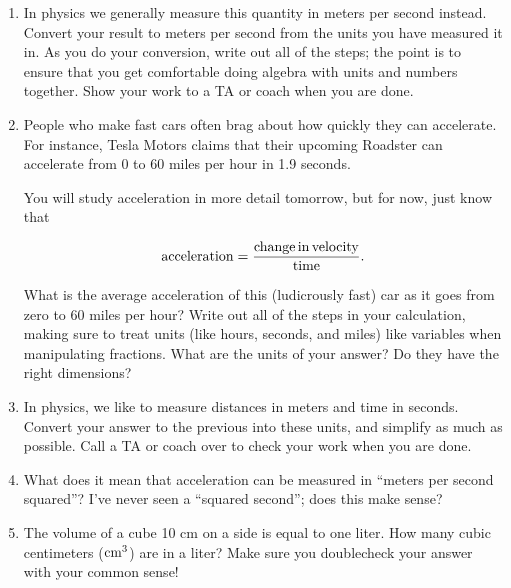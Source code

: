 \documentclass[12pt]{article}
\begin{document}
\begin{enumerate}
\item In physics we generally measure this quantity in meters per second instead. 
Convert your result to meters per second from the units you have measured it in. As you do your conversion, write out all of the 
steps; the point is to ensure that you get comfortable doing algebra with units and numbers together. Show your work to a TA
or coach when you are done.

\vspace{3in}

\newpage


\item People who make fast cars often brag about how quickly they can accelerate. For instance, Tesla Motors claims that
their upcoming Roadster can accelerate from 0 to 60 miles per hour in 1.9 seconds. 

You will study acceleration in more detail tomorrow, but for now, just know that

$$
{\rm acceleration} = \frac{\rm change\, in\, velocity}{\rm time}.
$$

What is the average acceleration of this (ludicrously fast) car as it goes from zero to 60 miles per hour? Write out all of the
steps in your calculation, making sure to treat units (like hours, seconds, and miles) like variables when manipulating fractions.
What are the units of your answer? Do they have the right dimensions?

\vspace{1.2in}

\item In physics, we like to measure distances in meters and time in seconds. Convert your answer to the previous into these
units, and simplify as much as possible. Call a TA or coach over to check your work when you are done.

\vspace{2in}

\item What does it mean that acceleration can be measured in ``meters per second squared''? I've never seen a ``squared second'';
does this make sense?

\vspace{1in}

\item The volume of a cube 10 cm on a side is equal to one liter. How many cubic centimeters (${\rm cm}^3$) are in a liter?
Make sure you doublecheck your answer with your common sense!


\newpage


\end{enumerate}
\end{document}
